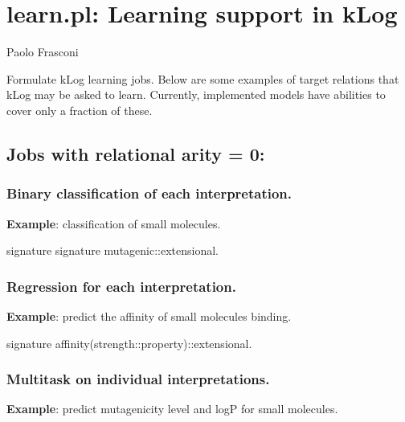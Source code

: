 


\section{learn.pl: Learning support in kLog}

\label{sec:learn}

\begin{tags}
Paolo Frasconi
\end{tags}

Formulate kLog learning jobs. Below are some examples of target
relations that kLog may be asked to learn. Currently, implemented
models have abilities to cover only a fraction of these.

\subsection{Jobs with relational arity = 0:}

\subsubsection{Binary classification of each interpretation.}

\textbf{Example}: classification of small molecules.

\begin{code}
signature signature mutagenic::extensional.
\end{code}

\subsubsection{Regression for each interpretation.}

\textbf{Example}: predict the affinity of small molecules binding.

\begin{code}
signature affinity(strength::property)::extensional.
\end{code}

\subsubsection{Multitask on individual interpretations.}

\textbf{Example}: predict mutagenicity level and logP for small molecules.

